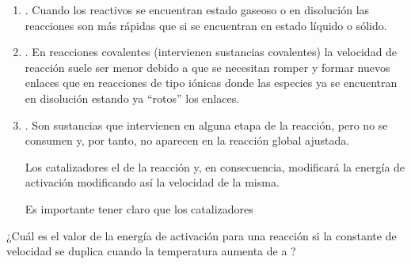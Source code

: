 \begin{enumerate}[label=\numberballmDarkTeal]
        \item {}.
        Cuando los reactivos se encuentran estado gaseoso o en disolución las reacciones son más rápidas que si se encuentran en estado líquido o sólido.
        \item {}.
        En reacciones covalentes (intervienen sustancias covalentes) la velocidad de reacción suele ser menor debido a que se necesitan romper y formar nuevos enlaces que en reacciones de tipo iónicas donde las especies ya se encuentran en disolución estando ya ``rotos'' los enlaces.
        \item {}.
        Son sustancias que intervienen en alguna etapa de la reacción, pero no se consumen y, por tanto, no aparecen en la reacción global ajustada.

        Los catalizadores  el  de la reacción y, en consecuencia, modificará la energía de activación modificando así la velocidad de la misma.

        Es importante tener claro que los catalizadores 
    \end{enumerate}

    \begin{ejemplo}
        ¿Cuál es el valor de la energía de activación para una reacción si la constante de velocidad se duplica cuando la temperatura aumenta de  a ?
    \end{ejemplo}




